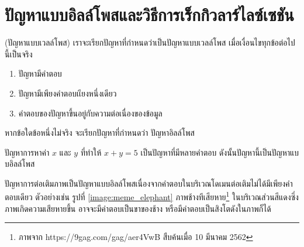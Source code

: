 \section{ปัญหาแบบอิลล์โพสและวิธีการเร็กกิวลาร์ไลซ์เซชัน}

\begin{Definition}
    (ปัญหาแบบเวลล์โพส) เราจะเรียกปัญหาที่กำหนดว่าเป็นปัญหาแบบเวลล์โพส เมื่อเงื่อนไขทุกข้อต่อไปนี้เป็นจริง
    \begin{enumerate}
        \item ปัญหามีคำตอบ
        \item ปัญหามีเพียงคำตอบเเียงหนึ่งเดียว
        \item คำตอบของปัญหาขึ้นอยู่กับความต่อเนื่องของข้อมูล
    \end{enumerate}    
    หากข้อใดข้อหนึ่งไม่จริง จะเรียกปัญหาที่กำหนดว่า ปัญหาอิลล์โพส
\end{Definition}


\begin{Example}
    ปัญหาการหาค่า $x$ และ $y$ ที่ทำให้ $x+y = 5$ เป็นปัญหาที่มีหลายคำตอบ ดังนั้นปัญหานี้เป็นปัญหาแบบอิลล์โพส
    \label{example:x_plus_y_5}
\end{Example}

\hspace{1cm} ปัญหาการต่อเติมภาพเป็นปัญหาแบบอิลล์โพสเนื่องจากคำตอบในบริเวณโดเมนต่อเติมไม่ได้มีเพียงคำตอบเดียว ตัวอย่างเช่น รูปที่ \ref{image:meme_elephant} ภาพช้างทีเสียหาย\footnote{ภาพจาก https://9gag.com/gag/aer4VwB สืบค้นเมื่อ 10 มีนาคม 2562} ในบริเวณส่วนสีแดงซึ่งภาพเกิดความเสียหายขึ้น อาจจะมีคำตอบเป็นขาของช้าง หรือมีคำตอบเป็นสิงโตดังในภาพก็ได้

